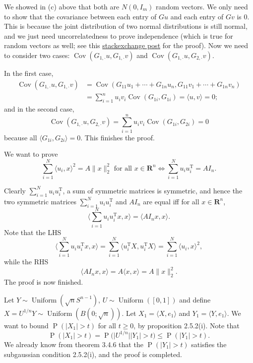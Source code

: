 \documentclass[11pt]{article}
\newcommand{\la}{\langle}
\newcommand{\ra}{\rangle}
\newcommand{\R}{\mathbf{R}}
\newcommand{\inp}[2]{\langle #1, #2 \rangle}
\newcommand{\nm}[1]{\lVert #1 \rVert}
\newcommand{\abs}[1]{\lvert #1 \rvert}
\newcommand{\trp}{\mathrm T}
\renewcommand{\Pr}{\operatorname{P}}
\newcommand{\Cov}{\operatorname{Cov}}
\theoremstyle{plain}
\theoremstyle{definition}
\theoremstyle{remark}
\theoremstyle{definition}
\newenvironment{mansol}[1]{%
  \renewcommand\themansolinner{#1}%
  \mansolinner
}{\endmansolinner}
\begin{document}
\begin{mansol}{3.3.6}
We showed in (c) above that both are $N(0,I_m)$ random vectors. We only need to show that the covariance between each entry of $Gu$ and each entry of $Gv$ is 0. This is because the joint distribution of two normal distributions is still normal, and we just need uncorrelatedness to prove independence (which is true for random vectors as well; see this \href{https://stats.stackexchange.com/questions/375217/definition-of-independence-of-two-random-vectors-and-how-to-show-it-in-the-joint}{stackexchange post} for the proof). Now we need to consider two cases: $\Cov(G_{1,\cdot}u,G_{1,\cdot}v)$ and $\Cov(G_{1,\cdot}u,G_{2,\cdot}v)$.

In the first case, \begin{align*}
\Cov(G_{1,\cdot}u,G_{1,\cdot}v) & = \Cov(G_{11}u_1 + \cdots + G_{1n}u_n, G_{11}v_1 + \cdots + G_{1n}v_n) \\ 
& = \sum_{i=1}^n u_i v_i \Cov(G_{1i},G_{1i}) = \inp{u}{v} = 0;
\end{align*}
and in the second case, \[
\Cov(G_{1,\cdot}u,G_{2,\cdot}v) = \sum_{i=1}^n u_i v_i \Cov(G_{1i},G_{2i}) = 0
\] because all $\inp{G_{1i}}{G_{2i}} = 0$. This finishes the proof.
\end{mansol}

\begin{mansol}{3.3.9}
    We want to prove \[\sum_{i=1}^N \inp{u_i}{x}^2 = A\nm{x}_2^2 \text{ for all }x \in \R^n \iff \sum_{i=1}^N u_i u_i^\trp = A I_n.\]

    Clearly $\sum_{i=1}^N u_i u_i^\trp$, a sum of symmetric matrices is symmetric, and hence the two symmetric matrices $\sum_{i=1}^N u_i u_i^\trp$ and $AI_n$ are equal iff for all $x \in \R^n$, \[
    \Big\la\sum_{i=1}^N u_i u_i^\trp x, x\Big\ra = \inp{A I_n x}{x}.
    \]
    Note that the LHS \[
     \Big\la\sum_{i=1}^N u_i u_i^\trp x, x\Big\ra = \sum_{i=1}^N \inp{u_i^\trp X}{u_i^\trp X} = \sum_{i=1}^N \inp{u_i}{x}^2,
    \]
    while the RHS \[
    \inp{A I_n x}{x} = A\inp{x}{x} = A \nm{x}_2^2.
    \]
    The proof is now finished.
\end{mansol}

\begin{mansol}{3.4.7}
Let $Y \sim \operatorname{Uniform}(\sqrt{n} S^{n-1})$, $U \sim \operatorname{Uniform}([0,1])$ and define $X = U^{1/n}Y \sim \operatorname{Uniform}(B(0;\sqrt{n}))$. Let $X_1 = \inp{X}{e_1}$ and $Y_1 = \inp{Y}{e_1}$. We want to bound $\Pr(\abs{X_1} > t)$ for all $t \geq 0$, by proposition 2.5.2(i). Note that
\[
\Pr(\abs{X_1} > t) = \Pr\bigl(\big\lvert U^{1/n} \big\rvert \abs{Y_1} > t\bigr) \leq \Pr(\abs{Y_1} > t).
\]
We already know from theorem 3.4.6 that the $\Pr(\abs{Y_1} > t)$ satisfies the subgaussian condition 2.5.2(i), and the proof is completed.
\end{mansol}
\end{document}
